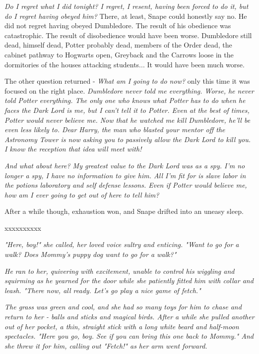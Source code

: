 \documentclass[a4paper,11pt]{article}
\begin{document}
\emph{Do I regret what I did tonight? I regret, I resent, having been forced to do it, but do I regret having obeyed him?} There, at least, Snape could honestly say no. He did not regret having obeyed Dumbledore. The result of his obedience was catastrophic. The result of disobedience would have been worse. Dumbledore still dead, himself dead, Potter probably dead, members of the Order dead, the cabinet pathway to Hogwarts open, Greyback and the Carrows loose in the dormitories of the houses attacking students... It would have been much worse.

The other question returned - \emph{What am I going to do now?} only this time it was focused on the right place. \emph{Dumbledore never told me everything. Worse, he never told Potter everything. The only one who knows what Potter has to do when he faces the Dark Lord is me, but I can't tell it to Potter. Even at the best of times, Potter would never believe me. Now that he watched me kill Dumbledore, he'll be even less likely to. Dear Harry, the man who blasted your mentor off the Astronomy Tower is now asking you to passively allow the Dark Lord to kill you. I know the reception that idea will meet with!}

\emph{And what about here? My greatest value to the Dark Lord was as a spy. I'm no longer a spy, I have no information to give him. All I'm fit for is slave labor in the potions laboratory and self defense lessons. Even if Potter would believe me, how am I ever going to get out of here to tell him?}

After a while though, exhaustion won, and Snape drifted into an uneasy sleep.

xxxxxxxxxx

\emph{"Here, boy!" she called, her loved voice sultry and enticing. "Want to go for a walk? Does Mommy's puppy dog want to go for a walk?"}

\emph{He ran to her, quivering with excitement, unable to control his wiggling and squirming as he yearned for the door while she patiently fitted him with collar and leash. "There now, all ready. Let's go play a nice game of fetch."}

\emph{The grass was green and cool, and she had so many toys for him to chase and return to her - balls and sticks and magical birds. After a while she pulled another out of her pocket, a thin, straight stick with a long white beard and half-moon spectacles. "Here you go, boy. See if you can bring this one back to Mommy." And she threw it for him, calling out "Fetch!" as her arm went forward.}
\end{document}
